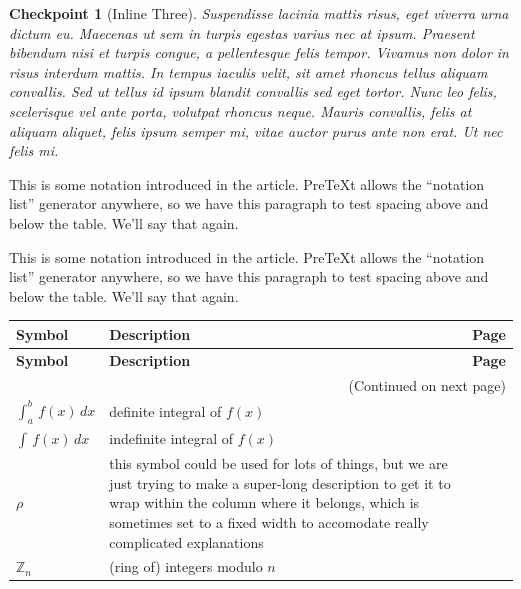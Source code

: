 \documentclass[pdflatex]{sn-jnl}
\theoremstyle{thmstyleone}%
\theoremstyle{thmstyletwo}%
\newtheorem{inlineexercise}[theorem]{Checkpoint}
\theoremstyle{thmstylethree}%
\numberwithin{equation}{section}
\begin{document}
\begin{inlineexercise}[Inline Three]\label{exercise-duplicate-inline}%
%
Suspendisse lacinia mattis risus, eget viverra urna dictum eu. Maecenas ut sem in turpis egestas varius nec at ipsum. Praesent bibendum nisi et turpis congue, a pellentesque felis tempor. Vivamus non dolor in risus interdum mattis. In tempus iaculis velit, sit amet rhoncus tellus aliquam convallis. Sed ut tellus id ipsum blandit convallis sed eget tortor. Nunc leo felis, scelerisque vel ante porta, volutpat rhoncus neque. Mauris convallis, felis at aliquam aliquet, felis ipsum semper mi, vitae auctor purus ante non erat. Ut nec felis mi.%
\end{inlineexercise}%
\backmatter
%
\begin{appendices}%
%
%
%
\typeout{************************************************}
\typeout{************************************************}
%
\label{appendix-notation}%
This is some notation introduced in the article.  PreTeXt allows the ``notation list'' generator anywhere, so we have this paragraph to test spacing above and below the table.  We'll say that again.%
\par
This is some notation introduced in the article.  PreTeXt allows the ``notation list'' generator anywhere, so we have this paragraph to test spacing above and below the table.  We'll say that again.%
\begin{longtable}[l]{lp{}r}
\addtocounter{table}{-1}
\textbf{Symbol}&\textbf{Description}&\textbf{Page}\\[1em]
\endfirsthead
\textbf{Symbol}&\textbf{Description}&\textbf{Page}\\[1em]
\endhead
\multicolumn{3}{r}{(Continued on next page)}\\
\endfoot
\endlastfoot
\(\int_a^b\,f(x)\,dx\)&definite integral of \(f(x)\)&\pageref{section-introduction-2-5}\\
\(\int\,f(x)\,dx\)&indefinite integral of \(f(x)\)&\pageref{definition-indefinite-integral-3}\\
\(\rho\)&this symbol could be used for lots of things, but we are just trying to make a super-long description to get it to wrap within the column where it belongs, which is sometimes set to a fixed width to accomodate really complicated explanations&\pageref{derivatives-9-2-3}\\
\(\mathbb{Z}_n\)&(ring of) integers modulo \(n\)&\pageref{derivatives-9-2-11}\\

\end{longtable}
\end{appendices}
\end{document}
